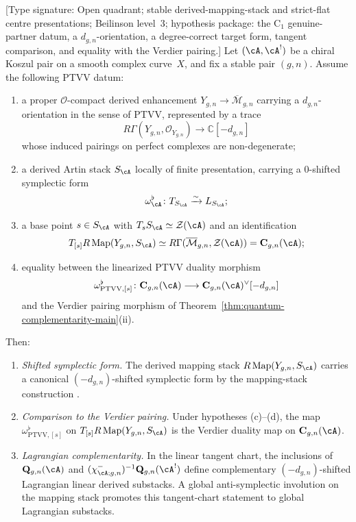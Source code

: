 \begin{theorem}
\label{thm:C-PTVV-alternative}
%
\ClaimStatusConditional
\textup{[Type signature: Open quadrant; stable derived-mapping-stack
and strict-flat centre presentations; Beilinson level~\(3\);
hypothesis package: the \(\mathrm C_1\) genuine-partner datum, a
\(d_{g,n}\)-orientation, a degree-correct target form, tangent
comparison, and equality with the Verdier pairing.]}
Let $(\cA, \cA^!)$ be a chiral Koszul pair on a smooth complex
curve~$X$, and fix a stable pair \((g,n)\). Assume the following PTVV
datum:
\begin{enumerate}[label=\textup{(\alph*)}]
\item a proper $\mathcal{O}$-compact derived enhancement
$Y_{g,n} \to \overline{\mathcal{M}}_{g,n}$ carrying a
\(d_{g,n}\)-orientation in the sense of PTVV, represented by a trace
\[
 R\Gamma(Y_{g,n},\mathcal{O}_{Y_{g,n}})
 \longrightarrow
 \mathbb{C}[-d_{g,n}]
\]
whose induced pairings on perfect complexes are non-degenerate;
\item a derived Artin stack $S_\cA$ locally of finite presentation,
carrying a $0$-shifted symplectic form
\[
 \omega_\cA^\flat\colon
 T_{S_\cA}\xrightarrow{\sim}L_{S_\cA};
\]
\item a base point $s\in S_\cA$ with
$T_sS_\cA\simeq\mathcal{Z}(\cA)$ and an identification
\[
 T_{[s]}R\operatorname{Map}(Y_{g,n},S_\cA)
 \simeq
 R\Gamma(\overline{\mathcal{M}}_{g,n},\mathcal{Z}(\cA))
 = \mathbf{C}_{g,n}(\cA);
\]
\item equality between the linearized PTVV duality morphism
\[
 \omega_{\mathrm{PTVV},[s]}^\flat\colon
 \mathbf{C}_{g,n}(\cA)
 \longrightarrow
 \mathbf{C}_{g,n}(\cA)^\vee[-d_{g,n}]
\]
and the Verdier pairing morphism of
Theorem~\textup{\ref{thm:quantum-complementarity-main}(ii)}.
\end{enumerate}
Then\textup{:}
\begin{enumerate}[label=\textup{(\roman*)}]
\item \emph{Shifted symplectic form.}
\ClaimStatusConditional%
 The derived mapping stack
 $R\operatorname{Map}(Y_{g,n},S_\cA)$
 carries a canonical $(-d_{g,n})$-shifted symplectic form by the
 mapping-stack construction
 \textup{\cite[Theorem~2.5]{PTVV13}}.

\item \emph{Comparison to the Verdier pairing.}
\ClaimStatusConditional%
 Under hypotheses \textup{(c)}--\textup{(d)}, the map
 $\omega_{\mathrm{PTVV},[s]}^\flat$ on
 $T_{[s]}R\operatorname{Map}(Y_{g,n},S_\cA)$ is the Verdier duality map
 on $\mathbf{C}_{g,n}(\cA)$.

\item \emph{Lagrangian complementarity.}
\ClaimStatusConditional%
 In the linear tangent chart, the inclusions of
 \(\mathbf Q_{g,n}(\cA)\) and
 \((\chi^-_{\cA;g,n})^{-1}\mathbf Q_{g,n}(\cA^!)\) define
 complementary \((-d_{g,n})\)-shifted Lagrangian linear derived
 substacks.  A global anti-symplectic involution on the mapping stack
 promotes this tangent-chart statement to global Lagrangian
 substacks.
\end{enumerate}
\end{theorem}

